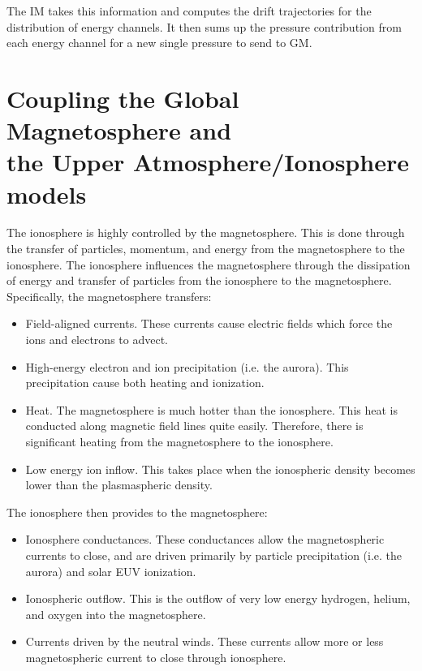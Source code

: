 The IM takes this information and computes the drift trajectories for
the distribution of energy channels.  It then sums up the pressure
contribution from each energy channel for a new single pressure to send
to GM.

\section{Coupling the Global Magnetosphere and \\
         the Upper Atmosphere/Ionosphere models}

The ionosphere is highly controlled by the magnetosphere.  This is
done through the transfer of particles, momentum, and energy from the
magnetosphere to the ionosphere.  The ionosphere influences the
magnetosphere through the dissipation of energy and transfer of
particles from the ionosphere to the magnetosphere.  Specifically,
the magnetosphere transfers:

\begin{itemize}

\item
Field-aligned currents.  These currents cause electric fields which 
force the ions and electrons to advect.

\item
High-energy electron and ion precipitation (i.e. the aurora).  This
precipitation cause both heating and ionization.

\item
Heat.  The magnetosphere is much hotter than the ionosphere.  This
heat is conducted along magnetic field lines quite easily.  Therefore,
there is significant heating from the magnetosphere to the ionosphere.

\item
Low energy ion inflow.  This takes place when the ionospheric density
becomes lower than the plasmaspheric density.

\end{itemize}

The ionosphere then provides to the magnetosphere:

\begin{itemize}

\item
Ionosphere conductances.  These conductances allow the magnetospheric
currents to close, and are driven primarily by particle precipitation
(i.e. the aurora) and solar EUV ionization.

\item
Ionospheric outflow.  This is the outflow of very low energy hydrogen,
helium, and oxygen into the magnetosphere.

\item
Currents driven by the neutral winds.  These currents allow more or
less magnetospheric current to close through ionosphere.

\end{itemize}

